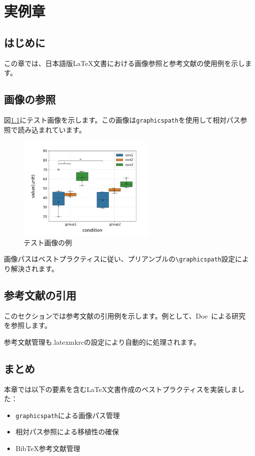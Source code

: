 \chapter{実例章}

\section{はじめに}

この章では、日本語版LaTeX文書における画像参照と参考文献の使用例を示します。

\section{画像の参照}

図\ref{fig:test_image_jp}にテスト画像を示します。この画像は\texttt{graphicspath}を使用して相対パス参照で読み込まれています。

\begin{figure}[htbp]
    \centering
    \includegraphics[width=0.6\textwidth]{figures/test/test.png}
    \caption{テスト画像の例}
    \label{fig:test_image_jp}
\end{figure}

画像パスはベストプラクティスに従い、プリアンブルの\texttt{\textbackslash graphicspath}設定により解決されます。

\section{参考文献の引用}

このセクションでは参考文献の引用例を示します。例として、Doe~\cite{example}による研究を参照します。

参考文献管理も.latexmkrcの設定により自動的に処理されます。

\section{まとめ}

本章では以下の要素を含むLaTeX文書作成のベストプラクティスを実装しました：

\begin{itemize}
    \item \texttt{graphicspath}による画像パス管理
    \item 相対パス参照による移植性の確保
    \item BibTeX参考文献管理
\end{itemize}
